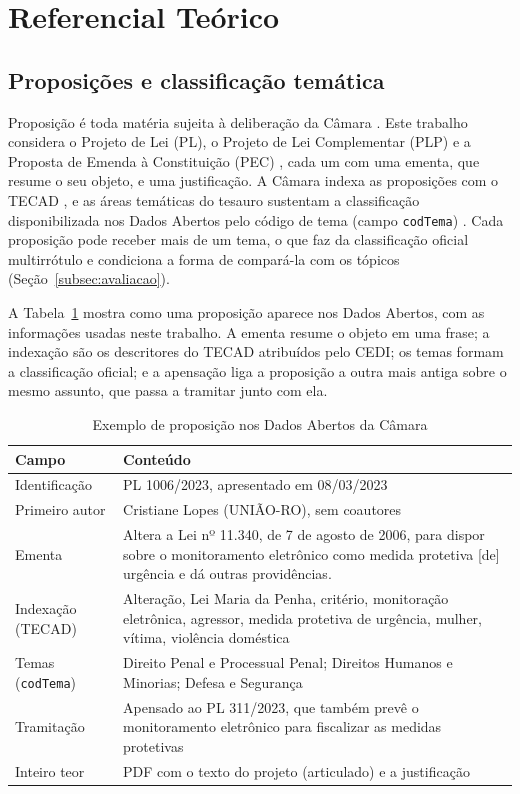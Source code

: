 \documentclass[12pt]{article}
\newcommand{\tabfont}{\fontsize{9}{11}\selectfont\setlength{\tabcolsep}{2.5pt}}
\begin{document}
\section{Referencial Teórico}
\label{sec:referencial}

\subsection{Proposições e classificação temática}
\label{subsec:teoria-leg}

Proposição é toda matéria sujeita à deliberação da Câmara \citep{camara1997regimento}. Este trabalho considera o Projeto de Lei (PL), o Projeto de Lei Complementar (PLP) e a Proposta de Emenda à Constituição (PEC) \citep{brasil1988constituicao}, cada um com uma ementa, que resume o seu objeto, e uma justificação. A Câmara indexa as proposições com o TECAD \citep{camara2013atomesa}, e as áreas temáticas do tesauro \citep{braga2017tecad} sustentam a classificação disponibilizada nos Dados Abertos pelo código de tema (campo \texttt{codTema}) \citep{camara2019dadosabertos}. Cada proposição pode receber mais de um tema, o que faz da classificação oficial multirrótulo e condiciona a forma de compará-la com os tópicos (Seção~\ref{subsec:avaliacao}).

A Tabela~\ref{tab:exemplo-prop} mostra como uma proposição aparece nos Dados Abertos, com as informações usadas neste trabalho. A ementa resume o objeto em uma frase; a indexação são os descritores do TECAD atribuídos pelo CEDI; os temas formam a classificação oficial; e a apensação liga a proposição a outra mais antiga sobre o mesmo assunto, que passa a tramitar junto com ela.

\begin{table}[H]
\centering
\caption{Exemplo de proposição nos Dados Abertos da Câmara}
\label{tab:exemplo-prop}
\tabfont
\begin{tabularx}{\textwidth}{>{\raggedright\arraybackslash}p{3.2cm} >{\raggedright\arraybackslash}X}
\toprule
\textbf{Campo} & \textbf{Conteúdo} \\
\midrule
Identificação & PL 1006/2023, apresentado em 08/03/2023 \\
Primeiro autor & Cristiane Lopes (UNIÃO-RO), sem coautores \\
Ementa & Altera a Lei nº 11.340, de 7 de agosto de 2006, para dispor sobre o monitoramento eletrônico como medida protetiva [de] urgência e dá outras providências. \\
Indexação (TECAD) & Alteração, Lei Maria da Penha, critério, monitoração eletrônica, agressor, medida protetiva de urgência, mulher, vítima, violência doméstica \\
Temas (\texttt{codTema}) & Direito Penal e Processual Penal; Direitos Humanos e Minorias; Defesa e Segurança \\
Tramitação & Apensado ao PL 311/2023, que também prevê o monitoramento eletrônico para fiscalizar as medidas protetivas \\
Inteiro teor & PDF com o texto do projeto (articulado) e a justificação \\
\bottomrule
\end{tabularx}
\end{table}
\end{document}
